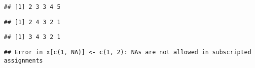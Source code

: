 \begin{verbatim}
## [1] 2 3 3 4 5
\end{verbatim}

\begin{Shaded}
\begin{Highlighting}[]
\NormalTok{x[}\OperatorTok{-}\NormalTok{] <-}\StringTok{ }\OperatorTok{:}
\end{Highlighting}
\end{Shaded}

\begin{verbatim}
## [1] 2 4 3 2 1
\end{verbatim}

\begin{Shaded}
\begin{Highlighting}[]
\NormalTok{x[}\NormalTok{(}\NormalTok{, }\NormalTok{)] <-}\StringTok{ }\OperatorTok{:}
\end{Highlighting}
\end{Shaded}

\begin{verbatim}
## [1] 3 4 3 2 1
\end{verbatim}

\begin{Shaded}
\begin{Highlighting}[]
\NormalTok{x[}\NormalTok{(}\NormalTok{, }\NormalTok{)] <-}\StringTok{ }\NormalTok{(}\NormalTok{, }\NormalTok{)}
\end{Highlighting}
\end{Shaded}

\begin{verbatim}
## Error in x[c(1, NA)] <- c(1, 2): NAs are not allowed in subscripted assignments
\end{verbatim}

\begin{Shaded}
\begin{Highlighting}[]
\NormalTok{x[}\NormalTok{)] <-}\StringTok{ }
\end{Highlighting}
\end{Shaded}

